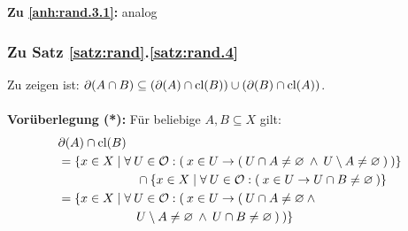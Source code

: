     \noindent
    \textbf{Zu \ref{anh:rand.3.1}: } analog

\subsubsection{Zu Satz \ref{satz:rand}.\ref{satz:rand.4}}\label{anh:rand.4}
    Zu zeigen ist: $\partial(A \cap B) \subseteq (\partial(A) \cap \text{cl}(B)) \cup (\partial(B) \cap \text{cl}(A))$.\\ \ \\

    \noindent
    \textbf{Vorüberlegung (*): } Für beliebige $A, B \subseteq X$ gilt:
        \begin{align*}
            &\partial(A) \cap \text{cl}(B) \\ 
            &= \{x \in X \mid \forall\: U \in \mathcal{O}: (\: x \in U \to (\: U \cap A \neq \varnothing \:\land\: U \setminus A \neq \varnothing \:) \:)\}\\
            &\hphantom{XXXXXXX}\cap \{x \in X \mid \forall\: U \in \mathcal{O}: (\: x \in U \to U \cap B \neq \varnothing \:)\}\\
            &= \{x \in X \mid \forall\: U \in \mathcal{O}: (\: x \in U \to (\: U \cap A \neq \varnothing \:\land\:\\
            &\hphantom{XXXXXXX} U \setminus A \neq \varnothing \:\land\: U \cap B \neq \varnothing \:) \:)\}
        \end{align*}

